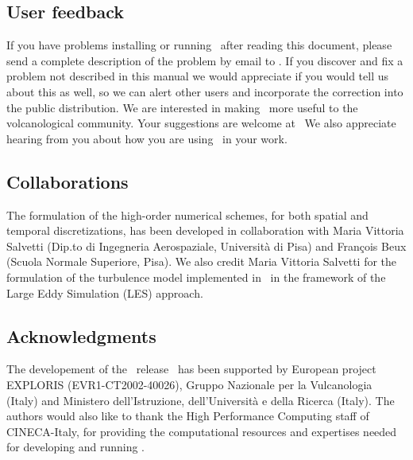 \subsection{User feedback}

If you have problems installing or running \PDAC\ after
reading this document, please send a
complete description of the problem by email to \PDACADDRESS.
If you discover and fix a problem not described in this manual we would
appreciate if you would tell us about this as well, so we can alert
other users and incorporate the correction into the public distribution.
\prettypar
We are interested in making \PDAC\ more useful to the volcanological
community.  Your suggestions are welcome at \PDACADDRESS\ 
We also appreciate hearing from you about how you are using \PDAC\ 
in your work.


\subsection{Collaborations}
The formulation of the high-order numerical schemes, for both spatial
and temporal discretizations, has been developed in collaboration with
Maria Vittoria Salvetti (Dip.to di Ingegneria Aerospaziale, Universit\`a 
di Pisa) and Fran\c{c}ois Beux (Scuola Normale Superiore, Pisa). We also
credit Maria Vittoria Salvetti for the formulation of the turbulence model
implemented in \PDAC\ in the framework of the Large Eddy Simulation
(LES) approach.

\subsection{Acknowledgments}

The developement of the \PDAC\ release \PDACVERSION\ has been supported 
by European project EXPLORIS (EVR1-CT2002-40026), Gruppo Nazionale per
la Vulcanologia (Italy) and Ministero dell'Istruzione, dell'Universit\`a 
e della Ricerca (Italy).
\prettypar
The authors would also like to thank the High Performance Computing
staff of CINECA-Italy, for providing the computational resources and expertises
needed for developing and running \PDAC.
\prettypar
